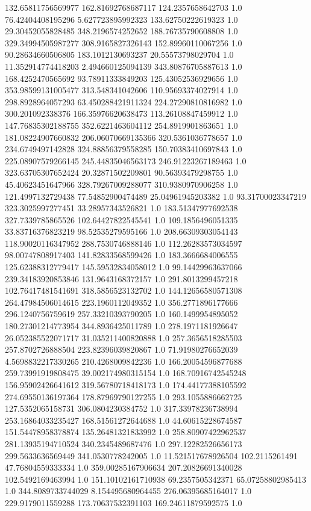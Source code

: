 132.65811756569977	162.81692768687117	124.2357658642703	1.0
76.42404408195296	5.627723895992323	133.62750222619323	1.0
29.30452055828485	348.2196574252652	188.76735790608808	1.0
329.34994505987277	308.9165827326143	152.89960110067256	1.0
90.28634660506805	183.1012130693237	20.55573798029704	1.0
11.352914774418203	2.494660125094139	343.80876705887613	1.0
168.4252470565692	93.78911333849203	125.43052536929656	1.0
353.98599131005477	313.548341042606	110.95693374027914	1.0
298.8928964057293	63.450288421911324	224.27290810816982	1.0
300.201092338376	166.35976620638473	113.26108847459912	1.0
147.76835302188755	352.6221463604112	254.8919901863651	1.0
181.08224907660832	206.06070669135366	320.5361036778657	1.0
234.6749497142828	324.88856379558285	150.70383410697843	1.0
225.08907579266145	245.44835046563173	246.91223267189463	1.0
323.63705307652424	20.32871502209801	90.56393479298755	1.0
45.40623451647966	328.79267009288077	310.9380970906258	1.0
121.4997132729438	77.54852900474489	25.04961945203382	1.0
93.31700023347219	323.3025997277451	33.28957343526821	1.0
183.51347977692538	327.7339785865526	102.64427822545541	1.0
109.1856496051335	33.83716376823219	98.52535279595166	1.0
208.66309303054143	118.90020116347952	288.7530746888146	1.0
112.26283573034597	98.00747808917403	141.82833568599426	1.0
183.3666684006555	125.62388312779417	145.59532834058012	1.0
99.14429963637066	239.34183920853846	131.9643168372157	1.0
291.8013299457218	102.76417481541691	318.5856523132702	1.0
144.12656580571308	264.47984506014615	223.1960112049352	1.0
356.2771896177666	296.1240756759619	257.33210393790205	1.0
160.1499954895052	180.27301214773954	344.8936425011789	1.0
278.1971181926647	26.052385522071717	31.035211400820888	1.0
257.3656518285503	257.8702726888504	223.82396039820867	1.0
71.91980276652039	4.5698832217330265	210.4268009842236	1.0
166.20054596877688	259.73991919808475	39.002174980315154	1.0
168.70916742545248	156.95902426641612	319.56780718418173	1.0
174.44177388105592	274.69550136197364	178.87969790127255	1.0
293.1055886662725	127.5352065158731	306.0804230384752	1.0
317.33978236738994	253.16864033235427	168.51561272644688	1.0
44.60615228674587	151.54478958378874	135.26481321833992	1.0
258.80907422962537	281.13935194710524	340.2345489687476	1.0
297.12282526656173	299.5633636569449	341.0530778242005	1.0
11.521517678926504	102.2115261491	47.76804559333334	1.0
359.00285167906634	207.20826691340028	102.5492169463994	1.0
151.10102161710938	69.2357505342371	65.07258802985413	1.0
344.8089733744029	8.154495680964455	276.06395685164017	1.0
229.9179011559288	173.70637532391103	169.24611879592575	1.0

